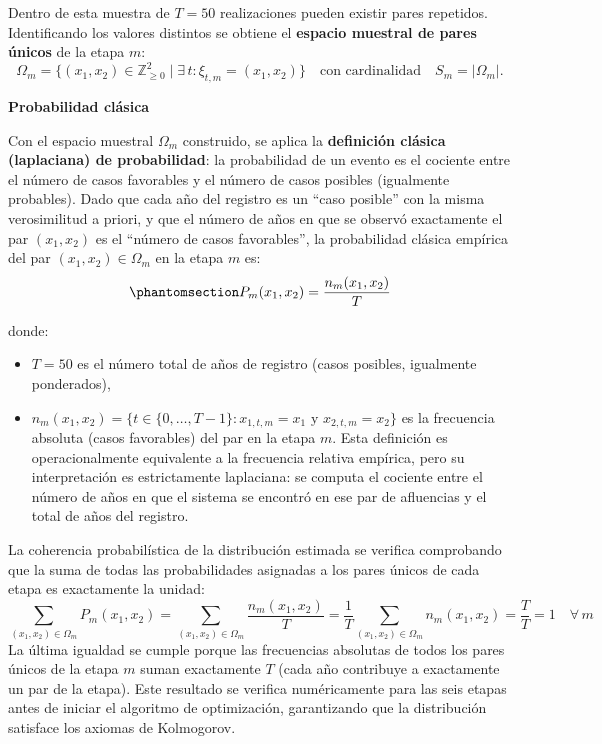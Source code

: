 \documentclass[
  spanish,
  letterpaper,
]{scrreprt}
\providecommand{\tightlist}{%
  \setlength{\itemsep}{0pt}\setlength{\parskip}{0pt}}
\theoremstyle{definition}
\theoremstyle{remark}
\begin{document}
Dentro de esta muestra de \(T = 50\) realizaciones pueden existir pares
repetidos. Identificando los valores distintos se obtiene el
\textbf{espacio muestral de pares únicos} de la etapa \(m\): \[
\Omega_m = \bigl\{(x_1, x_2) \in \mathbb{Z}_{\ge 0}^2 \;\big|\; \exists\, t : \xi_{t,m} = (x_1, x_2)\bigr\}
\quad \text{con cardinalidad}\quad S_m = |\Omega_m|.
\]

\textbf{Probabilidad clásica}

Con el espacio muestral \(\Omega_m\) construido, se aplica la
\textbf{definición clásica (laplaciana) de probabilidad}: la
probabilidad de un evento es el cociente entre el número de casos
favorables y el número de casos posibles (igualmente probables). Dado
que cada año del registro es un ``caso posible'' con la misma
verosimilitud a priori, y que el número de años en que se observó
exactamente el par \((x_1, x_2)\) es el ``número de casos favorables'',
la probabilidad clásica empírica del par \((x_1, x_2) \in \Omega_m\) en
la etapa \(m\) es:
\begin{equation}\protect\phantomsection\label{eq-probabilidad-clasica}{
P_m(x_1, x_2) = \frac{n_m(x_1, x_2)}{T}
}\end{equation}

donde:

\begin{itemize}
\tightlist
\item
  \(T = 50\) es el número total de años de registro (casos posibles,
  igualmente ponderados),
\item
  \(n_m(x_1, x_2) = \bigl\{t \in \{0,\ldots,T-1\} : x_{1,t,m} = x_1 \text{ y } x_{2,t,m} = x_2\bigr\}\)
  es la frecuencia absoluta (casos favorables) del par en la etapa
  \(m\). Esta definición es operacionalmente equivalente a la frecuencia
  relativa empírica, pero su interpretación es estrictamente laplaciana:
  se computa el cociente entre el número de años en que el sistema se
  encontró en ese par de afluencias y el total de años del registro.
\end{itemize}

La coherencia probabilística de la distribución estimada se verifica
comprobando que la suma de todas las probabilidades asignadas a los
pares únicos de cada etapa es exactamente la unidad: \[
\sum_{(x_1, x_2) \in \Omega_m} P_m(x_1, x_2)
= \sum_{(x_1, x_2) \in \Omega_m} \frac{n_m(x_1, x_2)}{T}
= \frac{1}{T} \sum_{(x_1, x_2) \in \Omega_m} n_m(x_1, x_2)
= \frac{T}{T} = 1
\quad \forall\, m
\] La última igualdad se cumple porque las frecuencias absolutas de
todos los pares únicos de la etapa \(m\) suman exactamente \(T\) (cada
año contribuye a exactamente un par de la etapa). Este resultado se
verifica numéricamente para las seis etapas antes de iniciar el
algoritmo de optimización, garantizando que la distribución satisface
los axiomas de Kolmogorov.
\end{document}
